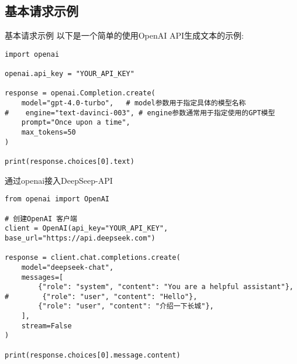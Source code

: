 \subsection{基本请求示例}
\begin{frame}[fragile]{基本请求示例}
	以下是一个简单的使用\textrm{OpenAI API}生成文本的示例:
    \begin{lstlisting}[style=pythonstyle]
import openai

openai.api_key = "YOUR_API_KEY"

response = openai.Completion.create(
    model="gpt-4.0-turbo",   # model参数用于指定具体的模型名称
#    engine="text-davinci-003", # engine参数通常用于指定使用的GPT模型
    prompt="Once upon a time",
    max_tokens=50
)

print(response.choices[0].text)
    \end{lstlisting}
\end{frame}

\begin{frame}[fragile]{通过\textrm{openai}接入\textrm{DeepSeep-API}}
        \begin{lstlisting}[style=pythonstyle]
from openai import OpenAI

# 创建OpenAI 客户端
client = OpenAI(api_key="YOUR_API_KEY", base_url="https://api.deepseek.com")

response = client.chat.completions.create(
    model="deepseek-chat",
    messages=[
        {"role": "system", "content": "You are a helpful assistant"},
#        {"role": "user", "content": "Hello"},
        {"role": "user", "content": "介绍一下长城"},
    ],
    stream=False
)

print(response.choices[0].message.content)
        \end{lstlisting}
\end{frame}

